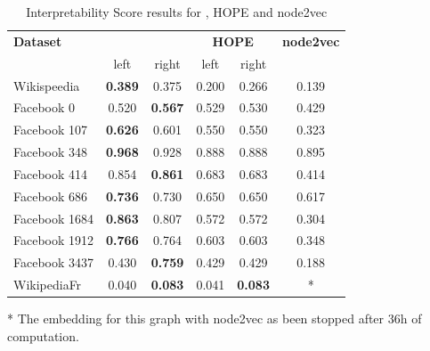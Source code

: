 \begin{table}[t]
    \caption{Interpretability Score results for \parfaite{}, HOPE and node2vec}
    \begin{center}
        \begin{tabular}{l|c|c|c|c|c}
            \hline
            \textbf{Dataset} & \multicolumn{2}{|c|}{\textbf{\parfaite{}}} & \multicolumn{2}{|c|}{\textbf{HOPE}} & \textbf{node2vec}\\
            & left & right & left & right\\
            \hline
Wikispeedia  &  \textbf{0.389} & 0.375 & 0.200 & 0.266 & 0.139\\
Facebook 0 & 0.520 & \textbf{0.567} & 0.529 & 0.530 & 0.429\\
Facebook 107 & \textbf{0.626} & 0.601 & 0.550 & 0.550 & 0.323\\
Facebook 348 & \textbf{0.968} & 0.928 & 0.888 & 0.888 & 0.895\\
Facebook 414 & 0.854 & \textbf{0.861} & 0.683 & 0.683 & 0.414\\
Facebook 686 & \textbf{0.736} & 0.730 & 0.650 & 0.650 & 0.617\\
Facebook 1684 & \textbf{0.863} & 0.807 & 0.572 & 0.572 & 0.304\\
Facebook 1912 & \textbf{0.766} & 0.764 & 0.603 & 0.603 & 0.348\\
Facebook 3437 & 0.430 & \textbf{0.759} & 0.429 & 0.429 & 0.188\\
WikipediaFr  &  0.040 & \textbf{0.083} & 0.041 & \textbf{0.083} & *\\
\hline
        \end{tabular}
    \end{center}
    \label{tab:IS_scores}
    * The embedding for this graph with node2vec as been stopped after 36h of computation.
\end{table}



